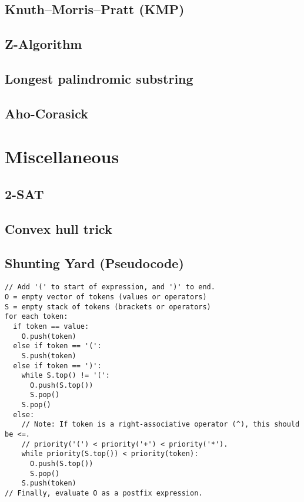 \documentclass[9pt]{extarticle}
\begin{document}
\begin{multicols*}{3}
\subsection{Knuth--Morris--Pratt (KMP)}


\subsection{Z-Algorithm}


\subsection{Longest palindromic substring} %


\subsection{Aho-Corasick}


\section{Miscellaneous}

\subsection{2-SAT} %


\subsection{Convex hull trick} %


\subsection{Shunting Yard (Pseudocode)} %
\begin{lstlisting}
// Add '(' to start of expression, and ')' to end.
O = empty vector of tokens (values or operators)
S = empty stack of tokens (brackets or operators)
for each token:
  if token == value:
    O.push(token)
  else if token == '(':
    S.push(token)
  else if token == ')':
    while S.top() != '(':
      O.push(S.top())
      S.pop()
    S.pop()
  else:
    // Note: If token is a right-associative operator (^), this should be <=.
	// priority('(') < priority('+') < priority('*').
    while priority(S.top()) < priority(token):
      O.push(S.top())
      S.pop()
    S.push(token)
// Finally, evaluate O as a postfix expression.
\end{lstlisting}


\end{multicols*}
\end{document}
